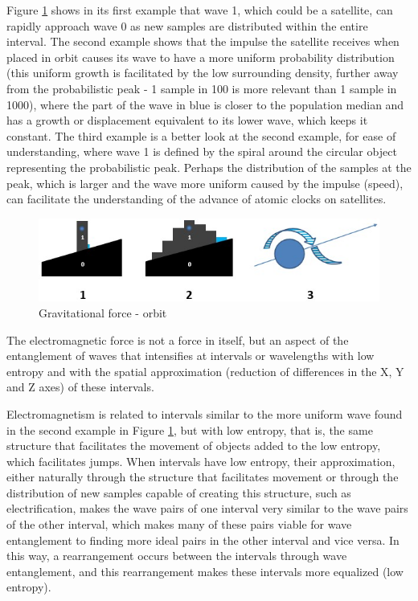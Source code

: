 Figure \ref{fig:consciousness_gravitational_orbit} shows in its first example that wave 1, which could be a satellite, can rapidly approach wave 0 as new samples are distributed within the entire interval. The second example shows that the impulse the satellite receives when placed in orbit causes its wave to have a more uniform probability distribution (this uniform growth is facilitated by the low surrounding density, further away from the probabilistic peak - 1 sample in 100 is more relevant than 1 sample in 1000), where the part of the wave in blue is closer to the population median and has a growth or displacement equivalent to its lower wave, which keeps it constant. The third example is a better look at the second example, for ease of understanding, where wave 1 is defined by the spiral around the circular object representing the probabilistic peak. Perhaps the distribution of the samples at the peak, which is larger and the wave more uniform caused by the impulse (speed), can facilitate the understanding of the advance of atomic clocks on satellites.
	\begin{figure}[H]
	\caption{Gravitational force - orbit}
	\label{fig:consciousness_gravitational_orbit}
	\centering
	\includegraphics[scale=.9]{sections/images/consciousness_gravitational_orbit.jpg}
	\end{figure}

The electromagnetic force is not a force in itself, but an aspect of the entanglement of waves that intensifies at intervals or wavelengths with low entropy and with the spatial approximation (reduction of differences in the X, Y and Z axes) of these intervals.

Electromagnetism is related to intervals similar to the more uniform wave found in the second example in Figure \ref{fig:consciousness_gravitational_orbit}, but with low entropy, that is, the same structure that facilitates the movement of objects added to the low entropy, which facilitates jumps. When intervals have low entropy, their approximation, either naturally through the structure that facilitates movement or through the distribution of new samples capable of creating this structure, such as electrification, makes the wave pairs of one interval very similar to the wave pairs of the other interval, which makes many of these pairs viable for wave entanglement to finding more ideal pairs in the other interval and vice versa. In this way, a rearrangement occurs between the intervals through wave entanglement, and this rearrangement makes these intervals more equalized (low entropy).

